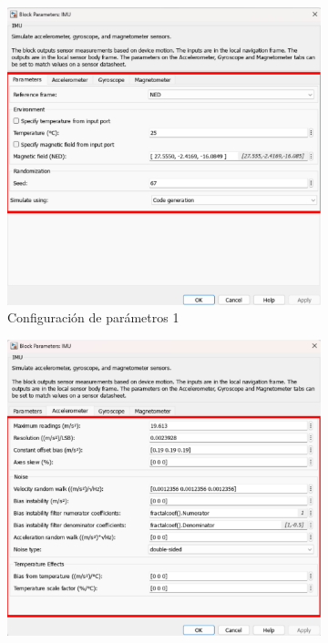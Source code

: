 \begin{figure}[htbp]
\begin{subfigure}[b]{0.45\textwidth}
        \includegraphics[width=\textwidth]{fig/Capitulo5/Caso_de_estudio_IMU/Generador_de_archivos/configuracion_parametros_IMU_01.pdf}
        \caption{Configuración de parámetros 1}
        \label{fig:parametros_IMU_01}
    \end{subfigure}
    \hfill
    \begin{subfigure}[b]{0.45\textwidth}
        \centering
        \includegraphics[width=\textwidth]{fig/Capitulo5/Caso_de_estudio_IMU/Generador_de_archivos/configuracion_parametros_IMU_02.pdf}

\end{subfigure}
\end{figure}
